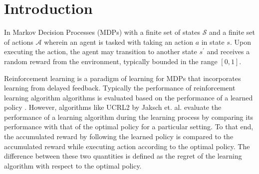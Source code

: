 \normallinespacing

\chapter{Introduction}

In Markov Decision Processes (MDPs) with a finite set of states $\mathcal{S}$ and a finite set of actions $\mathcal{A}$ wherein an agent is tasked with taking an action $a$ in state $s$.
Upon executing the action, the agent may transition to another state $s^\prime$ and receives a random reward from the environment, typically bounded in the range $[0, 1]$.

Reinforcement learning is a paradigm of learning for MDPs that incorporates learning from delayed feedback.
Typically the performance of reinforcement learning algorithm algorithms is evaluated based on the performance of a learned policy \cite{sutton_reinforcement_2018, kearns_finite-sample_1999}.
However, algorithms like UCRL2 \cite{jaksch_near-optimal_2010} by Jaksch et. al. evaluate the performance of a learning algorithm during the learning process by comparing its performance with that of the optimal policy for a particular setting.
To that end, the accumulated reward by following the learned policy is compared to the accumulated reward while executing action according to the optimal policy.
The difference between these two quantities is defined as the regret of the learning algorithm with respect to the optimal policy.

